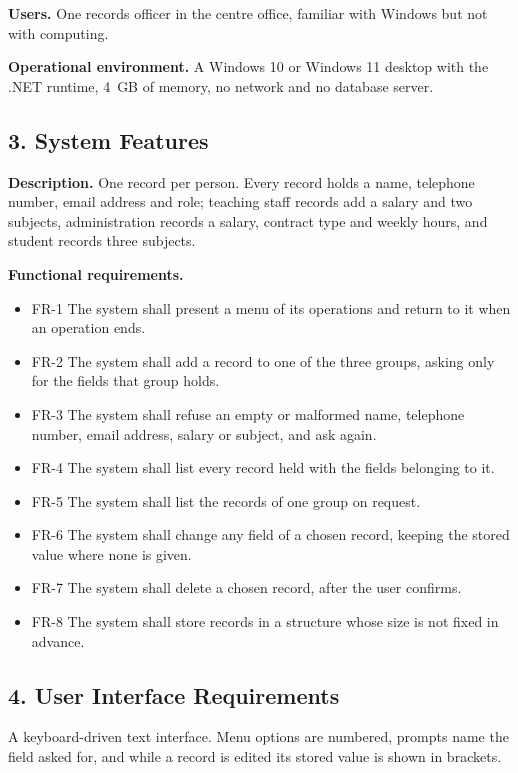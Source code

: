\documentclass[11pt,a4paper]{article}
\begin{document}
\textbf{Users.} One records officer in the centre office, familiar with Windows
but not with computing.

\textbf{Operational environment.} A Windows 10 or Windows 11 desktop with the
.NET runtime, 4~GB of memory, no network and no database server.

\subsection*{3. System Features}

\textbf{Description.} One record per person. Every record holds a name,
telephone number, email address and role; teaching staff records add a salary
and two subjects, administration records a salary, contract type and weekly
hours, and student records three subjects.

\textbf{Functional requirements.}
\begin{itemize}\setlength{\itemsep}{0pt}
  \item FR-1 The system shall present a menu of its operations and return to it
        when an operation ends.
  \item FR-2 The system shall add a record to one of the three groups, asking
        only for the fields that group holds.
  \item FR-3 The system shall refuse an empty or malformed name, telephone
        number, email address, salary or subject, and ask again.
  \item FR-4 The system shall list every record held with the fields belonging
        to it.
  \item FR-5 The system shall list the records of one group on request.
  \item FR-6 The system shall change any field of a chosen record, keeping the
        stored value where none is given.
  \item FR-7 The system shall delete a chosen record, after the user confirms.
  \item FR-8 The system shall store records in a structure whose size is not
        fixed in advance.
\end{itemize}

\subsection*{4. User Interface Requirements}

A keyboard-driven text interface. Menu options are numbered, prompts name the
field asked for, and while a record is edited its stored value is shown in
brackets.
\end{document}
